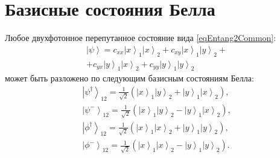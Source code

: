 \section{Базисные состояния Белла}

Любое двухфотонное перепутанное состояние вида \eqref{eqEntang2Common}:
\begin{eqnarray}
\left|\psi\right> =  
c_{xx} \left|x\right>_1\left|x\right>_2 +
c_{xy} \left|x\right>_1\left|y\right>_2 +
\nonumber \\
+
c_{yx} \left|y\right>_1\left|x\right>_2 +
c_{yy} \left|y\right>_1\left|y\right>_2
\nonumber
\end{eqnarray}
может быть разложено по следующим базисным состояниям Белла:
\begin{eqnarray}
  \left|\psi^{\dag}\right>_{12} = 
  \frac{1}{\sqrt{2}}\left(
  \left|x\right>_1\left|y\right>_2 + 
  \left|y\right>_1\left|x\right>_2
  \right),
  \nonumber \\
  \left|\psi^{-}\right>_{12} = 
  \frac{1}{\sqrt{2}}\left(
  \left|x\right>_1\left|y\right>_2 - 
  \left|y\right>_1\left|x\right>_2
  \right),
  \nonumber \\
  \left|\phi^{\dag}\right>_{12} = 
  \frac{1}{\sqrt{2}}\left(
  \left|x\right>_1\left|x\right>_2 + 
  \left|y\right>_1\left|y\right>_2
  \right),
  \nonumber \\
  \left|\phi^{-}\right>_{12} = 
  \frac{1}{\sqrt{2}}\left(
  \left|x\right>_1\left|x\right>_2 - 
  \left|y\right>_1\left|y\right>_2
  \right).
  \label{eqEntangBellBase}
\end{eqnarray}
 
